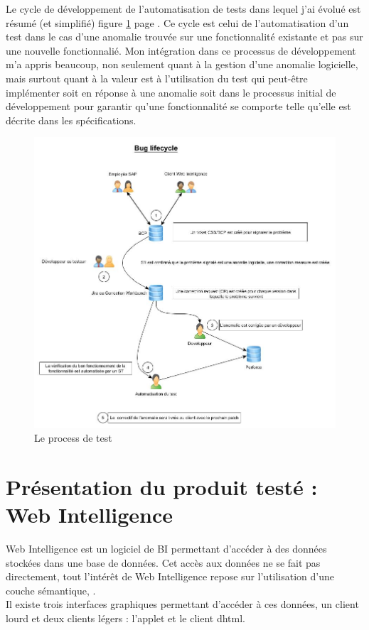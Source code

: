 Le cycle de d\'{e}veloppement de l'automatisation de tests dans lequel j'ai \'{e}volu\'{e} est r\'{e}sum\'{e} (et simplifi\'{e}) figure \ref{figure:testProcess} page \pageref{figure:testProcess}. Ce cycle est celui de l'automatisation d'un test dans le cas d'une anomalie trouv\'{e}e sur une fonctionnalit\'{e} existante et pas sur une nouvelle fonctionnali\'{e}. Mon int\'{e}gration dans ce processus de d\'{e}veloppement m'a appris beaucoup, non seulement quant \`{a} la gestion d'une anomalie logicielle, mais surtout quant \`{a} la valeur est \`{a} l'utilisation du test qui peut-\^{e}tre impl\'{e}menter soit en r\'{e}ponse \`{a} une anomalie soit dans le processus initial de d\'{e}veloppement pour garantir qu'une fonctionnalit\'{e} se comporte telle qu'elle est d\'{e}crite dans les sp\'{e}cifications.\\
\begin{figure}[!ht]
  \centering
      \includegraphics[width=\textwidth]{images/testProcessAtSAP.jpg}
  \caption{Le process de test}
	\label{figure:testProcess}
\end{figure}
 


\section{Pr\'{e}sentation du produit test\'{e} : Web Intelligence}
Web Intelligence est un logiciel de BI permettant d'acc\'{e}der \`{a} des donn\'{e}es stock\'{e}es dans une base de donn\'{e}es. Cet acc\`{e}s aux donn\'{e}es ne se fait pas directement, tout l'int\'{e}r\^{e}t de Web Intelligence repose sur l'utilisation d'une couche s\'{e}mantique, .\\
Il existe trois interfaces graphiques permettant d'acc\'{e}der \`{a} ces donn\'{e}es, un client lourd et deux clients l\'{e}gers : l'applet et le client dhtml.

